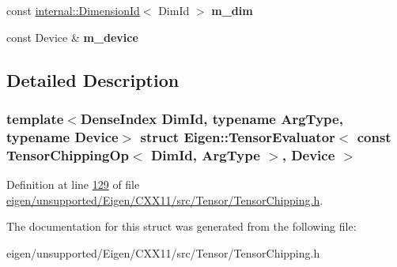 \begin{DoxyCompactItemize}
const \hyperlink{struct_eigen_1_1internal_1_1_dimension_id}{internal\+::\+Dimension\+Id}$<$ Dim\+Id $>$ {\bfseries m\+\_\+dim}
\item 
\mbox{\label{struct_eigen_1_1_tensor_evaluator_3_01const_01_tensor_chipping_op_3_01_dim_id_00_01_arg_type_01_4_00_01_device_01_4_afff6f68e9908244641c0b21e1c59cd14}} 
const Device \& {\bfseries m\+\_\+device}
\end{DoxyCompactItemize}


\subsection{Detailed Description}
\subsubsection*{template$<$Dense\+Index Dim\+Id, typename Arg\+Type, typename Device$>$\newline
struct Eigen\+::\+Tensor\+Evaluator$<$ const Tensor\+Chipping\+Op$<$ Dim\+Id, Arg\+Type $>$, Device $>$}



Definition at line \hyperlink{eigen_2unsupported_2_eigen_2_c_x_x11_2src_2_tensor_2_tensor_chipping_8h_source_l00129}{129} of file \hyperlink{eigen_2unsupported_2_eigen_2_c_x_x11_2src_2_tensor_2_tensor_chipping_8h_source}{eigen/unsupported/\+Eigen/\+C\+X\+X11/src/\+Tensor/\+Tensor\+Chipping.\+h}.



The documentation for this struct was generated from the following file\+:\begin{DoxyCompactItemize}
\item 
eigen/unsupported/\+Eigen/\+C\+X\+X11/src/\+Tensor/\+Tensor\+Chipping.\+h\end{DoxyCompactItemize}
